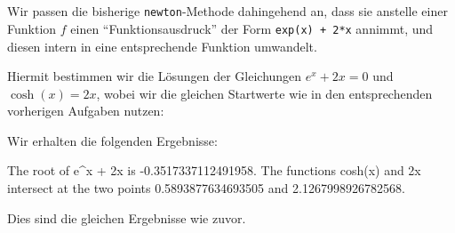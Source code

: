 \section{}

Wir passen die bisherige \texttt{newton}-Methode dahingehend an, dass sie anstelle einer Funktion $f$ einen \enquote{Funktionsausdruck} der Form \texttt{exp(x) + 2*x} annimmt, und diesen intern in eine entsprechende Funktion umwandelt.



Hiermit bestimmen wir die Lösungen der Gleichungen $e^x + 2x = 0$ und $\cosh(x) = 2x$, wobei wir die gleichen Startwerte wie in den entsprechenden vorherigen Aufgaben nutzen:



Wir erhalten die folgenden Ergebnisse:

\begin{consoleoutput}
The root of e^x + 2x is -0.3517337112491958.
The functions cosh(x) and 2x intersect at the two points 0.5893877634693505 and 2.1267998926782568.
\end{consoleoutput}

Dies sind die gleichen Ergebnisse wie zuvor.
